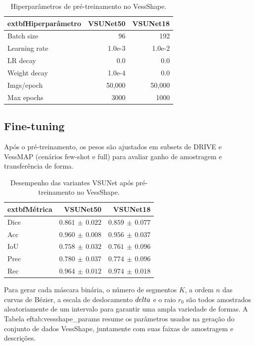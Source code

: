 \documentclass[%
reprint,
nofootinbib,
 amsmath,amssymb,
aps,
superscriptaddress,
showkeys,
longbibliography
]{revtex4-1}
\begin{document}
\begin{table}[t]
    \caption{Hiperparâmetros de pré-treinamento no VessShape.}
    \label{tab:vs_hparams}
    \centering
    \begingroup
    \small
    \setlength{\tabcolsep}{6pt}
    \renewcommand{\arraystretch}{1.15}
    \begin{tabular}{l r r}
        \hline
        	extbf{Hiperparâmetro} & \textbf{VSUNet50} & \textbf{VSUNet18} \\
        \hline
        Batch size & 96 & 192 \\
        Learning rate & 1.0e-3 & 1.0e-2 \\
        LR decay & 0.0 & 0.0 \\
        Weight decay & 1.0e-4 & 0.0 \\
        Imgs/epoch & 50{,}000 & 50{,}000 \\
        Max epochs & 3000 & 1000 \\
        \hline
    \end{tabular}
    \endgroup
\end{table}

\subsection{Fine-tuning}

Após o pré-treinamento, os pesos são ajustados em subsets de DRIVE e VessMAP (cenários few-shot e full) para avaliar ganho de amostragem e transferência de forma.

\begin{table}[t]
    \caption{Desempenho das variantes VSUNet após pré-treinamento no VessShape.}
    \label{tab:vessshape_results}
    \centering
    \begingroup
    \small
    \setlength{\tabcolsep}{6pt}
    \renewcommand{\arraystretch}{1.15}
    \begin{tabular}{l r r}
        \hline
        	extbf{Métrica} & \textbf{VSUNet50} & \textbf{VSUNet18} \\
        \hline
        Dice & $0.861 \,\pm\, 0.022$ & $0.859 \,\pm\, 0.077$ \\
        Acc & $0.960 \,\pm\, 0.008$ & $0.956 \,\pm\, 0.037$ \\
        IoU & $0.758 \,\pm\, 0.032$ & $0.761 \,\pm\, 0.096$ \\
        Prec & $0.780 \,\pm\, 0.037$ & $0.774 \,\pm\, 0.096$ \\
        Rec & $0.964 \,\pm\, 0.012$ & $0.974 \,\pm\, 0.018$ \\
        \hline
    \end{tabular}
    \endgroup
\end{table}
Para gerar cada máscara binária, o número de segmentos $K$, a ordem $n$ das curvas de Bézier, a escala de deslocamento $\\delta$ e o raio $r_0$ são todos amostrados aleatoriamente de um intervalo para garantir uma ampla variedade de formas. A Tabela 
ef{tab:vessshape_params} resume os parâmetros usados na geração do conjunto de dados VessShape, juntamente com suas faixas de amostragem e descrições.
\end{document}

